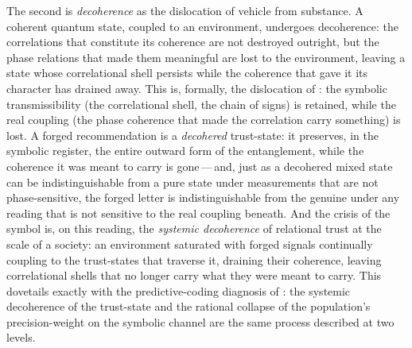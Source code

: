 The second is \emph{decoherence} as the dislocation of vehicle from substance. A coherent quantum state, coupled to an environment, undergoes decoherence: the correlations that constitute its coherence are not destroyed outright, but the phase relations that made them meaningful are lost to the environment, leaving a state whose correlational shell persists while the coherence that gave it its character has drained away. This is, formally, the dislocation of : the symbolic transmissibility (the correlational shell, the chain of signs) is retained, while the real coupling (the phase coherence that made the correlation carry something) is lost. A forged recommendation is a \emph{decohered} trust-state: it preserves, in the symbolic register, the entire outward form of the entanglement, while the coherence it was meant to carry is gone\,---\,and, just as a decohered mixed state can be indistinguishable from a pure state under measurements that are not phase-sensitive, the forged letter is indistinguishable from the genuine under any reading that is not sensitive to the real coupling beneath. And the crisis of the symbol is, on this reading, the \emph{systemic decoherence} of relational trust at the scale of a society: an environment saturated with forged signals continually coupling to the trust-states that traverse it, draining their coherence, leaving correlational shells that no longer carry what they were meant to carry. This dovetails exactly with the predictive-coding diagnosis of : the systemic decoherence of the trust-state and the rational collapse of the population's precision-weight on the symbolic channel are the same process described at two levels.

